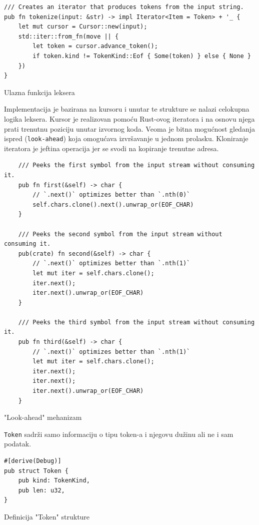\documentclass[11pt]{article}
\begin{document}
\begin{listing}[H]
\begin{verbatim}
/// Creates an iterator that produces tokens from the input string.
pub fn tokenize(input: &str) -> impl Iterator<Item = Token> + '_ {
    let mut cursor = Cursor::new(input);
    std::iter::from_fn(move || {
        let token = cursor.advance_token();
        if token.kind != TokenKind::Eof { Some(token) } else { None }
    })
}
\end{verbatim}
\caption{Ulazna funkcija leksera}
\label{lst:tokenize}
\end{listing}

\newpage
Implementacija je bazirana na kursoru i unutar te strukture se nalazi celokupna logika leksera. 
Kursor je realizovan pomoću Rust-ovog iteratora i na osnovu njega prati trenutnu poziciju 
unutar izvornog koda. Veoma je bitna mogućnost gledanja ispred (\verb|look-ahead|) koja omogućava 
izvršavanje u jednom prolasku.
Kloniranje iteratora je jeftina operacija jer se svodi na kopiranje trenutne adresa.

\begin{listing}[H]
\begin{verbatim}
    /// Peeks the first symbol from the input stream without consuming it.
    pub fn first(&self) -> char {
        // `.next()` optimizes better than `.nth(0)`
        self.chars.clone().next().unwrap_or(EOF_CHAR)
    }

    /// Peeks the second symbol from the input stream without consuming it.
    pub(crate) fn second(&self) -> char {
        // `.next()` optimizes better than `.nth(1)`
        let mut iter = self.chars.clone();
        iter.next();
        iter.next().unwrap_or(EOF_CHAR)
    }

    /// Peeks the third symbol from the input stream without consuming it.
    pub fn third(&self) -> char {
        // `.next()` optimizes better than `.nth(1)`
        let mut iter = self.chars.clone();
        iter.next();
        iter.next();
        iter.next().unwrap_or(EOF_CHAR)
    }
\end{verbatim}
\caption{"Look-ahead" mehanizam}
\end{listing}
\verb|Token| sadrži samo informaciju o tipu token-a i njegovu dužinu ali ne i 
sam podatak.

\begin{listing}[H]
\begin{verbatim}
#[derive(Debug)]
pub struct Token {
    pub kind: TokenKind,
    pub len: u32,
}   
\end{verbatim}
\caption{Definicija "Token" strukture}
\end{listing}
\end{document}
